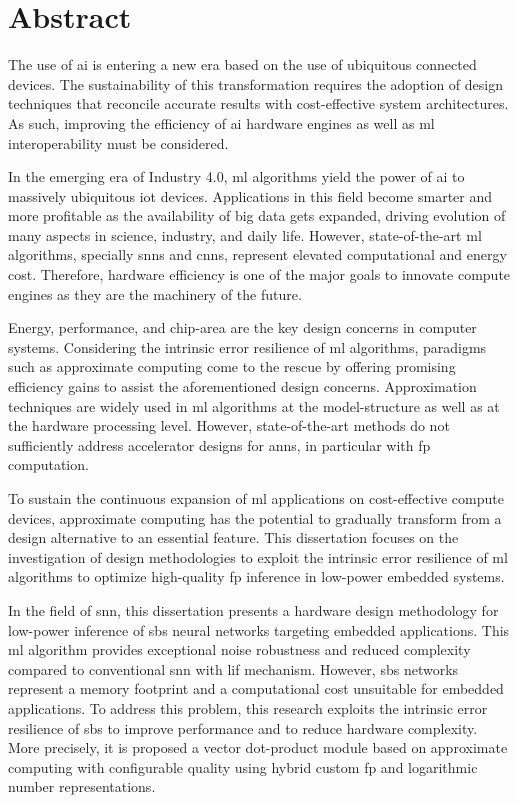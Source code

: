 \chapter*{Abstract}
\thispagestyle{empty}
The use of \gls{ai} is entering a new era based on the use of ubiquitous connected devices. The sustainability of this transformation requires the adoption of design techniques that reconcile accurate results with cost-effective system architectures. As such, improving the efficiency of \gls{ai} hardware engines as well as \gls{ml} interoperability must be considered.

In the emerging era of Industry 4.0, \gls{ml} algorithms yield the power of \gls{ai} to massively ubiquitous \gls{iot} devices. Applications in this field become smarter and more profitable as the availability of big data gets expanded, driving evolution of many aspects in science, industry, and daily life. However, state-of-the-art \gls{ml} algorithms, specially \glspl{snn} and \glspl{cnn}, represent elevated computational and energy cost. Therefore, hardware efficiency is one of the major goals to innovate compute engines as they are the machinery of the future.

Energy, performance, and chip-area are the key design concerns in computer systems. Considering the intrinsic error resilience of \gls{ml} algorithms, paradigms such as approximate computing come to the rescue by offering promising efficiency gains to assist the aforementioned design concerns. Approximation techniques are widely used in \gls{ml} algorithms at the model-structure as well as at the hardware processing level. However, state-of-the-art methods do not sufficiently address accelerator designs for \glspl{ann}, in particular with \gls{fp} computation.

To sustain the continuous expansion of \gls{ml} applications on cost-effective compute devices, approximate computing has the potential to gradually transform from a design alternative to an essential feature. This dissertation focuses on the investigation of design methodologies to exploit the intrinsic error resilience of \gls{ml} algorithms to optimize high-quality \gls{fp} inference in low-power embedded systems.

In the field of \gls{snn}, this dissertation presents a hardware design methodology for low-power inference of \gls{sbs} neural networks targeting embedded applications. This \gls{ml} algorithm provides exceptional noise robustness and reduced complexity compared to conventional \gls{snn} with \gls{lif} mechanism. However, \gls{sbs} networks represent a memory footprint and a computational cost unsuitable for embedded applications. To address this problem, this research exploits the intrinsic error resilience of \gls{sbs} to improve performance and to reduce hardware complexity. More precisely, it is proposed a vector dot-product module based on approximate computing with configurable quality using hybrid custom \gls{fp} and logarithmic number representations.

